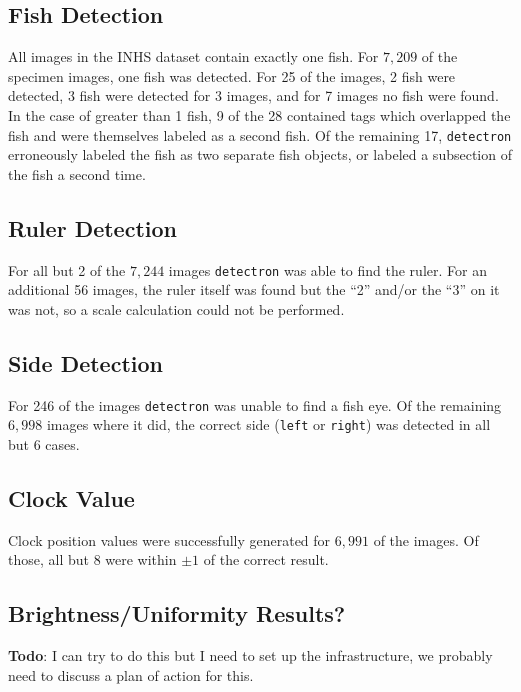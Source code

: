 \documentclass[conference]{IEEEtran}
\begin{document}
\subsection{Fish Detection}
All images in the INHS dataset contain exactly one fish. For \(7,209\) of the specimen images, one fish was detected. For 25 of the images, 2 fish were detected, 3 fish were detected for 3 images, and for 7 images no fish were found. In the case of greater than 1 fish, 9 of the 28 contained tags which overlapped the fish and were themselves labeled as a second fish. Of the remaining 17, \verb|detectron| erroneously labeled the fish as two separate fish objects, or labeled a subsection of the fish a second time.

\subsection{Ruler Detection}
For all but 2 of the \(7,244\) images \verb|detectron| was able to find the ruler. For an additional 56 images, the ruler itself was found but the ``2'' and/or the ``3'' on it was not, so a scale calculation could not be performed.

\subsection{Side Detection}
For 246 of the images \verb|detectron| was unable to find a fish eye. Of the remaining \(6,998\) images where it did, the correct side (\verb|left| or \verb|right|) was detected in all but 6 cases.

\subsection{Clock Value}
Clock position values were successfully generated for \(6,991\) of the images. Of those, all but 8 were within \(\pm{}1\) of the correct result.

\subsection{Brightness/Uniformity Results?}
\textbf{Todo}: I can try to do this but I need to set up the infrastructure, we probably need to discuss a plan of action for this.
\end{document}
